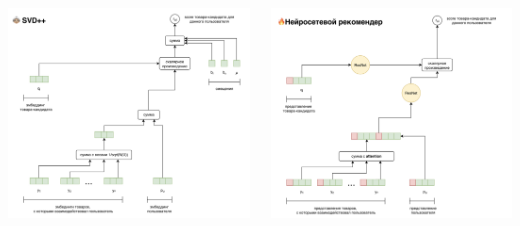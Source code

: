 \documentclass[11pt,aspectratio=169]{beamer}
\begin{document}
\begin{frame}

\begin{columns}
\begin{column}{0.47\textwidth} 
\begin{center}
\includegraphics[scale=0.25]{images/svdpp.png}
\end{center}
\end{column}
\begin{column}{0.47\textwidth}
\begin{center}
\includegraphics[scale=0.25]{images/nn.png}
\end{center}
\end{column}
\end{columns}

\end{frame}
\end{document}
